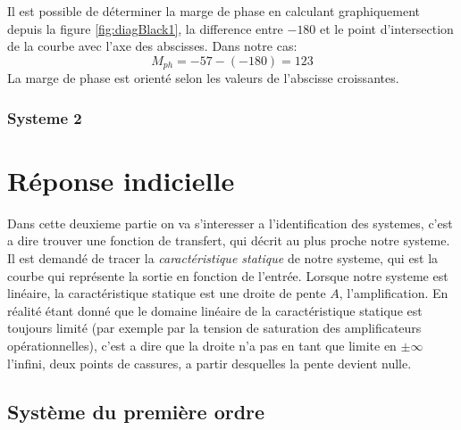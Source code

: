 \documentclass[12pt, a4paper]{report}
\begin{document}
Il est possible de déterminer la marge de phase en calculant graphiquement depuis la figure \ref{fig:diagBlack1}, la difference entre 
$-180$ et le point d'intersection de la courbe avec l'axe des abscisses. Dans notre cas:
\[
    M_{ph} = -57 - (-180) = 123 
    \]
La marge de phase est orienté selon les valeurs de l'abscisse croissantes.\par

\subsubsection{Systeme 2}

\section{Réponse indicielle}

\par
Dans cette deuxieme partie on va s'interesser a l'identification des systemes, c'est a dire 
trouver une fonction de transfert, qui décrit au plus proche notre systeme. Il est demandé de tracer
la \textit{caractéristique statique} de notre systeme, qui est la courbe qui représente la sortie
en fonction de l'entrée. Lorsque notre systeme est linéaire, la caractéristique statique est
une droite de pente $A$, l'amplification. En réalité étant donné que le domaine linéaire de la caractéristique statique est
toujours limité (par exemple par la tension de saturation des amplificateurs opérationnelles), c'est a dire 
que la droite n'a pas en tant que limite en $\pm \infty$ l'infini, deux points de cassures, a partir desquelles
la pente devient nulle.

\subsection{Système du première ordre}
\end{document}
